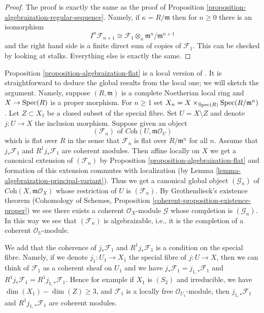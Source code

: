 \begin{proof}
The proof is exactly the same as the proof of
Proposition \ref{proposition-algebraization-regular-sequence}.
Namely, if $\kappa = R/\mathfrak m$ then for $n \geq 0$
there is an isomorphism
$$
I^n \mathcal{F}_{n + 1} \cong
\mathcal{F}_1 \otimes_\kappa \mathfrak m^n/\mathfrak m^{n + 1}
$$
and the right hand side is a finite direct sum of copies
of $\mathcal{F}_1$. This can be checked by looking at stalks.
Everything else is exactly the same.
\end{proof}

\begin{remark}
\label{remark-interesting-case-quater}
Proposition \ref{proposition-algebraization-flat} is a local version
of \cite[Theorem 2.10 (i)]{Baranovsky}. It is straightforward to deduce
the global results from the local one; we will sketch the argument.
Namely, suppose $(R, \mathfrak m)$
is a complete Noetherian local ring and $X \to \mathop{\mathrm{Spec}}(R)$ is a proper morphism.
For $n \geq 1$ set $X_n = X \times_{\mathop{\mathrm{Spec}}(R)} \mathop{\mathrm{Spec}}(R/\mathfrak m^n)$.
Let $Z \subset X_1$ be a closed subset of the special fibre.
Set $U = X \setminus Z$ and denote $j : U \to X$ the inclusion morphism.
Suppose given an object
$$
(\mathcal{F}_n) \text{ of } \textit{Coh}(U, \mathfrak m\mathcal{O}_U)
$$
which is flat over $R$ in the sense that $\mathcal{F}_n$ is flat over
$R/\mathfrak m^n$ for all $n$.
Assume that $j_*\mathcal{F}_1$ and $R^1j_*\mathcal{F}_1$ are coherent
modules. Then affine locally on $X$ we get a canonical extension
of $(\mathcal{F}_n)$ by
Proposition \ref{proposition-algebraization-flat}
and formation of this extension commutes with localization
(by Lemma \ref{lemma-algebraization-principal-variant}).
Thus we get a canonical global object $(\mathcal{G}_n)$ of
$\textit{Coh}(X, \mathfrak m\mathcal{O}_X)$
whose restriction of $U$ is $(\mathcal{F}_n)$.
By Grothendieck's existence theorem
(Cohomology of Schemes, Proposition
\ref{coherent-proposition-existence-proper})
we see there exists a coherent $\mathcal{O}_X$-module
$\mathcal{G}$ whose completion is $(\mathcal{G}_n)$.
In this way we see that $(\mathcal{F}_n)$ is algebraizable, i.e.,
it is the completion of a coherent $\mathcal{O}_U$-module.

\medskip\noindent
We add that the coherence of $j_*\mathcal{F}_1$ and $R^1j_*\mathcal{F}_1$
is a condition on the special fibre. Namely, if we denote
$j_1 : U_1 \to X_1$ the special fibre of $j : U \to X$, then we can
think of $\mathcal{F}_1$ as a coherent sheaf on $U_1$ and we have
$j_*\mathcal{F}_1 = j_{1, *}\mathcal{F}_1$ and
$R^1j_*\mathcal{F}_1 = R^1j_{1, *}\mathcal{F}_1$.
Hence for example if $X_1$ is $(S_2)$ and irreducible, we have
$\dim(X_1) - \dim(Z) \geq 3$, and $\mathcal{F}_1$ is a locally free
$\mathcal{O}_{U_1}$-module, then $j_{1, *}\mathcal{F}_1$ and
$R^1j_{1, *}\mathcal{F}_1$ are coherent modules.
\end{remark}









